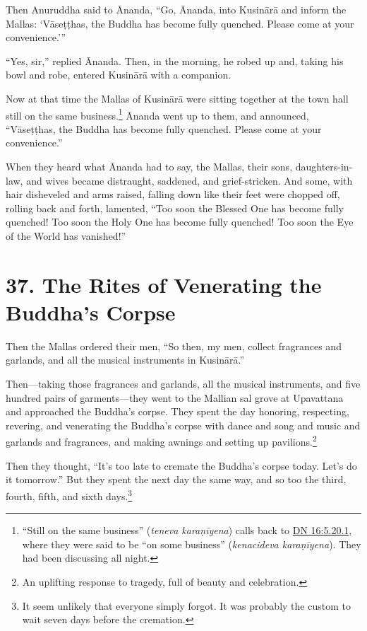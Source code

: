 \documentclass[12pt,openany]{book}%
\begin{document}
Then Anuruddha said to Ānanda, “Go, Ānanda, into \textsanskrit{Kusinārā} and inform the Mallas: ‘\textsanskrit{Vāseṭṭhas}, the Buddha has become fully quenched. Please come at your convenience.’” 

“Yes, sir,” replied Ānanda. Then, in the morning, he robed up and, taking his bowl and robe, entered \textsanskrit{Kusinārā} with a companion. 

Now at that time the Mallas of \textsanskrit{Kusinārā} were sitting together at the town hall still on the same business.\footnote{“Still on the same business” (\textit{teneva \textsanskrit{karaṇīyena}}) calls back to \href{https://suttacentral.net/dn16/en/sujato\#5.20.1}{DN 16:5.20.1}, where they were said to be “on some business” (\textit{kenacideva \textsanskrit{karaṇīyena}}). They had been discussing all night. } Ānanda went up to them, and announced, “\textsanskrit{Vāseṭṭhas}, the Buddha has become fully quenched. Please come at your convenience.” 

When they heard what Ānanda had to say, the Mallas, their sons, daughters-in-law, and wives became distraught, saddened, and grief-stricken. And some, with hair disheveled and arms raised, falling down like their feet were chopped off, rolling back and forth, lamented, “Too soon the Blessed One has become fully quenched! Too soon the Holy One has become fully quenched! Too soon the Eye of the World has vanished!” 

\section*{37. The Rites of Venerating the Buddha’s Corpse }

Then the Mallas ordered their men, “So then, my men, collect fragrances and garlands, and all the musical instruments in \textsanskrit{Kusinārā}.” 

Then—taking those fragrances and garlands, all the musical instruments, and five hundred pairs of garments—they went to the Mallian sal grove at Upavattana and approached the Buddha’s corpse. They spent the day honoring, respecting, revering, and venerating the Buddha’s corpse with dance and song and music and garlands and fragrances, and making awnings and setting up pavilions.\footnote{An uplifting response to tragedy, full of beauty and celebration. } 

Then they thought, “It’s too late to cremate the Buddha’s corpse today. Let’s do it tomorrow.” But they spent the next day the same way, and so too the third, fourth, fifth, and sixth days.\footnote{It seem unlikely that everyone simply forgot. It was probably the custom to wait seven days before the cremation. } 
\end{document}
